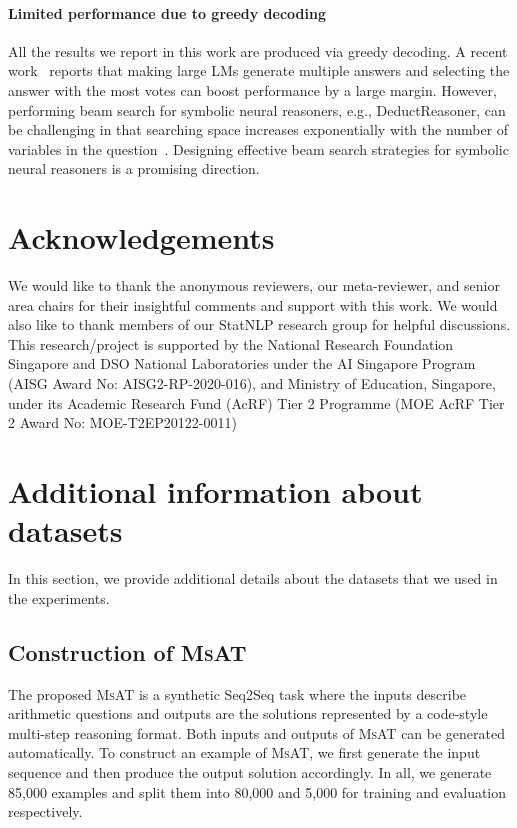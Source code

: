 \documentclass[11pt]{article}
\begin{document}
  
  \paragraph{Limited performance due to greedy decoding}
All the results we report in this work are produced via greedy decoding.
A recent work~\cite{wang2022selfconsistency} reports that making large LMs generate multiple answers and selecting the answer with the most votes can boost performance by a large margin.
However, performing beam search for symbolic neural reasoners, e.g., DeductReasoner, can be challenging
      in that searching space increases exponentially with the number of variables in the question~\cite{jie2022deductreason}.
Designing effective beam search strategies for symbolic neural reasoners is a promising direction.





\section*{Acknowledgements}
We would like to thank the anonymous reviewers, our meta-reviewer, and senior area chairs for their insightful comments and support with this work.
We would also like to thank members of our StatNLP research group for helpful discussions.
This research/project is supported by the National Research Foundation Singapore and DSO National Laboratories under the AI Singapore Program (AISG Award No: AISG2-RP-2020-016), and Ministry of Education, Singapore, under its Academic Research Fund (AcRF) Tier 2 Programme (MOE AcRF Tier 2 Award No: MOE-T2EP20122-0011)






\appendix



\section{Additional information about datasets}\label{app:datasets}
    In this section, we provide additional details about the datasets that we used in the experiments.



\subsection{Construction of \textsc{MsAT}}\label{app:msat}
    

    The proposed \textsc{MsAT} is a synthetic Seq2Seq task where the inputs describe arithmetic questions
      and outputs are the solutions represented by a code-style multi-step reasoning format.
Both inputs and outputs of \textsc{MsAT} can be generated automatically.
To construct an example of \textsc{MsAT}, we first generate the input sequence and then produce the output solution accordingly.
In all, we generate 85,000 examples and split them into 80,000 and 5,000 for training and evaluation respectively.
\end{document}
